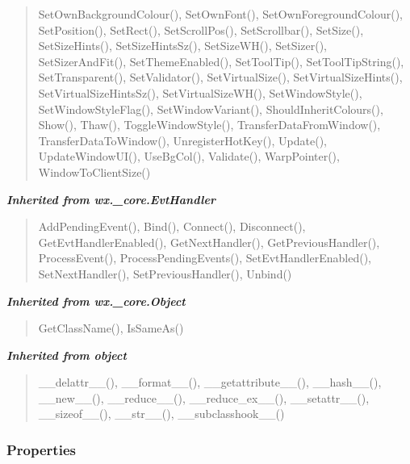 \begin{quote}
SetOwnBackgroundColour(), SetOwnFont(), SetOwnForegroundColour(), SetPosition(), SetRect(), SetScrollPos(), SetScrollbar(), SetSize(), SetSizeHints(), SetSizeHintsSz(), SetSizeWH(), SetSizer(), SetSizerAndFit(), SetThemeEnabled(), SetToolTip(), SetToolTipString(), SetTransparent(), SetValidator(), SetVirtualSize(), SetVirtualSizeHints(), SetVirtualSizeHintsSz(), SetVirtualSizeWH(), SetWindowStyle(), SetWindowStyleFlag(), SetWindowVariant(), ShouldInheritColours(), Show(), Thaw(), ToggleWindowStyle(), TransferDataFromWindow(), TransferDataToWindow(), UnregisterHotKey(), Update(), UpdateWindowUI(), UseBgCol(), Validate(), WarpPointer(), WindowToClientSize()
\end{quote}

\large{\textbf{\textit{Inherited from wx.\_core.EvtHandler}}}

\begin{quote}
AddPendingEvent(), Bind(), Connect(), Disconnect(), GetEvtHandlerEnabled(), GetNextHandler(), GetPreviousHandler(), ProcessEvent(), ProcessPendingEvents(), SetEvtHandlerEnabled(), SetNextHandler(), SetPreviousHandler(), Unbind()
\end{quote}

\large{\textbf{\textit{Inherited from wx.\_core.Object}}}

\begin{quote}
GetClassName(), IsSameAs()
\end{quote}

\large{\textbf{\textit{Inherited from object}}}

\begin{quote}
\_\_delattr\_\_(), \_\_format\_\_(), \_\_getattribute\_\_(), \_\_hash\_\_(), \_\_new\_\_(), \_\_reduce\_\_(), \_\_reduce\_ex\_\_(), \_\_setattr\_\_(), \_\_sizeof\_\_(), \_\_str\_\_(), \_\_subclasshook\_\_()
\end{quote}


  \subsubsection{Properties}

